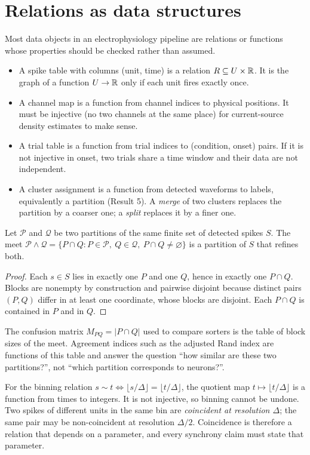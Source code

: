 \section{Relations as data structures}
Most data objects in an electrophysiology pipeline are relations or
functions whose properties should be checked rather than assumed.
\begin{itemize}[leftmargin=2em]
\item A spike table with columns (unit, time) is a relation
$R\subseteq U\times\mathbb{R}$. It is the graph of a function $U\to\mathbb{R}$ only
if each unit fires exactly once.
\item A channel map is a function from channel indices to physical
positions. It must be injective (no two channels at the same place)
for current-source density estimates to make sense.
\item A trial table is a function from trial indices to
(condition, onset) pairs. If it is not injective in onset, two trials
share a time window and their data are not independent.
\item A cluster assignment is a function from detected waveforms to
labels, equivalently a partition (Result 5). A \emph{merge} of two
clusters replaces the partition by a coarser one; a \emph{split}
replaces it by a finer one.
\end{itemize}

\begin{proposition}
Let $\mathcal P$ and $\mathcal Q$ be two partitions of the same finite
set of detected spikes $S$. The meet
$\mathcal P\wedge\mathcal Q=\{P\cap Q:P\in\mathcal P,\ Q\in\mathcal Q,\ P\cap Q\ne\varnothing\}$
is a partition of $S$ that refines both.
\end{proposition}
\begin{proof}
Each $s\in S$ lies in exactly one $P$ and one $Q$, hence in exactly one
$P\cap Q$. Blocks are nonempty by construction and pairwise disjoint
because distinct pairs $(P,Q)$ differ in at least one coordinate, whose
blocks are disjoint. Each $P\cap Q$ is contained in $P$ and in $Q$.
\end{proof}
The confusion matrix $M_{PQ}=|P\cap Q|$ used to compare sorters is
the table of block sizes of the meet. Agreement indices such as the
adjusted Rand index are functions of this table and answer the
question ``how similar are these two partitions?'', not ``which
partition corresponds to neurons?''.

\begin{example}
For the binning relation $s\sim t\iff\lfloor s/\Delta\rfloor=\lfloor t/\Delta\rfloor$,
the quotient map $t\mapsto\lfloor t/\Delta\rfloor$ is a function from
times to integers. It is not injective, so binning cannot be undone.
Two spikes of different units in the same bin are \emph{coincident at
resolution $\Delta$}; the same pair may be non-coincident at resolution
$\Delta/2$. Coincidence is therefore a relation that depends on a
parameter, and every synchrony claim must state that parameter.
\end{example}

